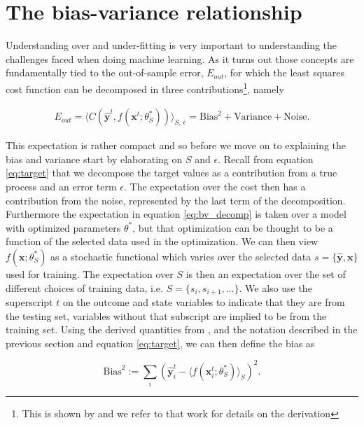 \section{The bias-variance relationship}\label{sec:bv}

Understanding over and under-fitting is very important to understanding the challenges faced when doing machine learning. As it turns out those concepts are fundamentally tied to the out-of-sample error, $E_{out}$, for which the least squares cost function can be decomposed in three contributions\footnote{This is shown by \citet{Mehta2019} and we refer to that work for details on the derivation}, namely

\begin{align}\label{eq:bv_decomp}
E_{out} = \langle C(\mathbf{\hat{y}}^t, f(\mathbf{x}^t; \theta^*_S))\rangle_{S,\, \epsilon} = \text{Bias}^2 + \text{Variance} + \text{Noise}.
\end{align}

\noindent This expectation is rather compact and so before we move on to explaining the bias and variance start by elaborating on $S$ and $\epsilon$. Recall from equation \ref{eq:target} that we decompose the target values as a contribution from a true process and an error term $\epsilon$. The expectation over the cost then has a contribution from the noise, represented by the last term of the decomposition. Furthermore the expectation in equation \ref{eq:bv_decomp} is taken over a model with optimized parameters $\theta^*$, but that optimization can be thought to be a function of the selected data used in the optimization. We can then view $f(\mathbf{x}; \theta^*_S)$ as a stochastic functional which varies over the selected data $s = \{\mathbf{\hat{y}}, \mathbf{x}\}$ used for training. The expectation over $S$ is then an expectation over the set of different choices of training data, i.e. $S = \{s_i, s_{i+1}, \dots\}$. We also use the superscript $t$ on the outcome and state variables to indicate that they are from the testing set, variables without that subscript are implied to be from the training set.
 Using the derived quantities from \citet{Mehta2019}, and the notation described in the previous section and equation \ref{eq:target}, we can then define the bias as

\begin{equation}\label{eq:bias}
\text{Bias}^2 := \sum_i (\mathbf{\hat{y}}_i^t - \langle f(\mathbf{x}_i^t; \theta_S^*)\rangle_S)^2.
\end{equation}

